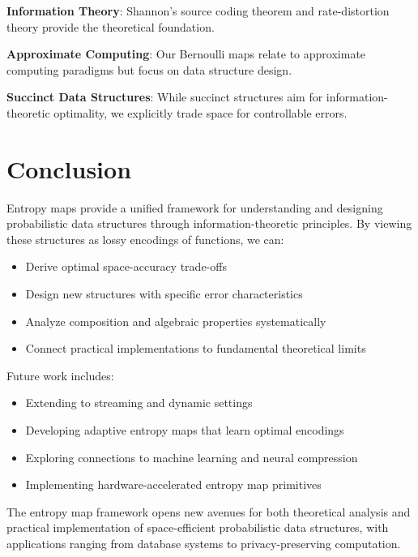 \documentclass[11pt]{article}
\begin{document}
\textbf{Information Theory}: Shannon's source coding theorem \cite{shannon1948} and rate-distortion theory \cite{cover2006} provide the theoretical foundation.

\textbf{Approximate Computing}: Our Bernoulli maps relate to approximate computing paradigms \cite{mittal2016} but focus on data structure design.

\textbf{Succinct Data Structures}: While succinct structures \cite{navarro2016} aim for information-theoretic optimality, we explicitly trade space for controllable errors.

\section{Conclusion}

Entropy maps provide a unified framework for understanding and designing probabilistic data structures through information-theoretic principles. By viewing these structures as lossy encodings of functions, we can:
\begin{itemize}
\item Derive optimal space-accuracy trade-offs
\item Design new structures with specific error characteristics
\item Analyze composition and algebraic properties systematically
\item Connect practical implementations to fundamental theoretical limits
\end{itemize}

Future work includes:
\begin{itemize}
\item Extending to streaming and dynamic settings
\item Developing adaptive entropy maps that learn optimal encodings
\item Exploring connections to machine learning and neural compression
\item Implementing hardware-accelerated entropy map primitives
\end{itemize}

The entropy map framework opens new avenues for both theoretical analysis and practical implementation of space-efficient probabilistic data structures, with applications ranging from database systems to privacy-preserving computation.
\end{document}
